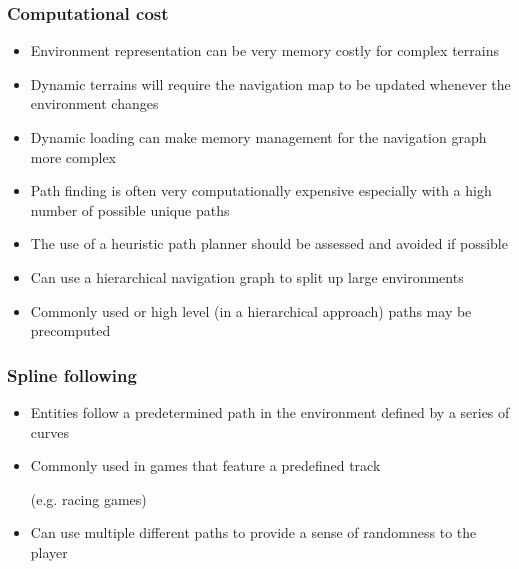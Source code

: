 \documentclass[a4paper]{article}
\begin{document}
\subsubsection{Computational cost}

\begin{itemize}
  \item
    Environment representation can be very memory costly for complex terrains

  \item
    Dynamic terrains will require the navigation map to be updated whenever the
    environment changes

  \item
    Dynamic loading can make memory management for the navigation graph more
    complex

  \item
    Path finding is often very computationally expensive especially with a high
    number of possible unique paths

  \item
    The use of a heuristic path planner should be assessed and avoided if
    possible

  \item
    Can use a hierarchical navigation graph to split up large environments

  \item
    Commonly used or high level (in a hierarchical approach) paths may be
    precomputed

\end{itemize}

\subsubsection{Spline following}

\begin{itemize}
  \item
    Entities follow a predetermined path in the environment defined by a series
    of curves

  \item
    Commonly used in games that feature a predefined track

    (e.g. racing games)

  \item
    Can use multiple different paths to provide a sense of randomness to the
    player

\end{itemize}
\end{document}
